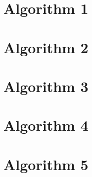 \documentclass{article}
\begin{document}
\section*{Algorithm 1}

\section*{Algorithm 2}

\section*{Algorithm 3}

\section*{Algorithm 4}

\section*{Algorithm 5}
\end{document}
